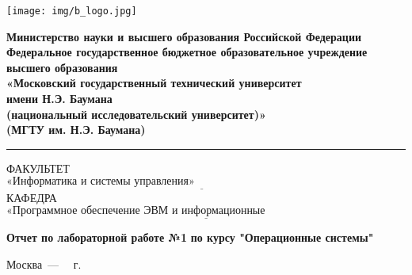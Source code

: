 \begin{titlepage}
	\fontsize{12pt}{12pt}\selectfont
	\noindent \begin{minipage}{0.15\textwidth}
		\texttt{[image: img/b\_logo.jpg]}
	\end{minipage}
	\noindent\begin{minipage}{0.9\textwidth}\centering
		\textbf{Министерство науки и высшего образования Российской Федерации}\\
		\textbf{Федеральное государственное бюджетное образовательное учреждение высшего образования}\\
		\textbf{«Московский государственный технический университет}\\
		\textbf{имени Н.Э. Баумана}\\
		\textbf{(национальный исследовательский университет)»}\\
		\textbf{(МГТУ им. Н.Э. Баумана)}
	\end{minipage}
	
	\noindent\rule{18cm}{3pt}
	\newline\newline
	\noindent ФАКУЛЬТЕТ $\underline{\text{«Информатика и системы управления»~~~~~~~~~~~~~~~~~~~~~~~~~~~~~~~~~~~~~~~~~~~~~~~~~~~~~~~}}$ \newline\newline
	\noindent КАФЕДРА $\underline{\text{«Программное обеспечение ЭВМ и информационные технологии»~~~~~~~~~~~~~~~~~~~~~~~}}$\newline\newline\newline\newline\newline
	
	
	\begin{center}
		\begin{Large}
		\Large\textbf{Отчет по лабораторной работе №1}\newline
		\Large\textbf{по курсу "Операционные системы"}\newline
		\end{Large}
	\end{center}
	
\noindent{}\underline{}\newline\newline
\noindent{}\underline{}\newline\newline
\noindent{}\underline{}\newline\newline
\noindent{} \underline{\makebox[135mm][l]{~}}\newline\newline
\noindent{} \underline{}\newline\newline
	
	\begin{center}
		\vfill
		Москва~---~\the\year
		~г.
	\end{center}
	\restoregeometry
\end{titlepage}
